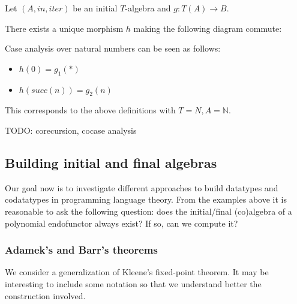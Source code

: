 \begin{lem}
	Let $(A,in,iter)$ be an initial $T$-algebra and $g:T(A) \to B$.
	
	There exists a unique morphism $h$ making the following diagram commute:
	
\end{lem}

\begin{example}
	Case analysis over natural numbers can be seen as follows:
	
	\begin{itemize}
		\item $h(0) = g_1(*)$
		\item $h(succ(n)) = g_2(n)$
	\end{itemize}

	This corresponds to the above definitions with $T = N, A = \mathbb{N}$.
\end{example}


TODO: corecursion, cocase analysis


\subsection{Building initial and final algebras}

Our goal now is to investigate different approaches to build datatypes and codatatypes in programming language theory. From the examples above it is reasonable to ask the following question: does the initial/final (co)algebra of a polynomial endofunctor always exist? If so, can we compute it?

\subsubsection{Adamek's and Barr's theorems}

We consider a generalization of Kleene's fixed-point theorem. It may be interesting to include some notation so that we understand better the construction involved. 

